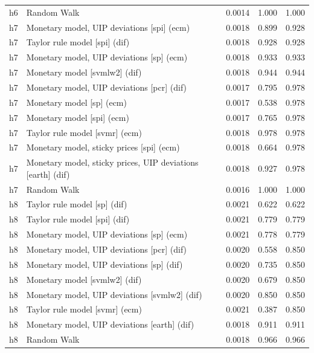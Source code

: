 \begin{ThreePartTable}
\begin{longtable}[t]{cp{5.5cm}ccc}
h6 & \raggedright Random Walk & 0.0014 & 1.000 & 1.000\\
\addlinespace
h7 & \raggedright Monetary model, UIP deviations [spi] (ecm) & 0.0018 & 0.899 & 0.928\\
h7 & \raggedright Taylor rule model [spi] (dif) & 0.0018 & 0.928 & 0.928\\
h7 & \raggedright Monetary model, UIP deviations [sp] (ecm) & 0.0018 & 0.933 & 0.933\\
h7 & \raggedright Monetary model [svmlw2] (dif) & 0.0018 & 0.944 & 0.944\\
h7 & \raggedright Monetary model, UIP deviations [pcr] (dif) & 0.0017 & 0.795 & 0.978\\
h7 & \raggedright Monetary model [sp] (ecm) & 0.0017 & 0.538 & 0.978\\
h7 & \raggedright Monetary model [spi] (ecm) & 0.0017 & 0.765 & 0.978\\
h7 & \raggedright Taylor rule model [svmr] (ecm) & 0.0018 & 0.978 & 0.978\\
h7 & \raggedright Monetary model, sticky prices [spi] (ecm) & 0.0018 & 0.664 & 0.978\\
h7 & \raggedright Monetary model, sticky prices, UIP deviations [earth] (dif) & 0.0018 & 0.927 & 0.978\\
h7 & \raggedright Random Walk & 0.0016 & 1.000 & 1.000\\
\addlinespace
h8 & \raggedright Taylor rule model [sp] (dif) & 0.0021 & 0.622 & 0.622\\
h8 & \raggedright Taylor rule model [spi] (dif) & 0.0021 & 0.779 & 0.779\\
h8 & \raggedright Monetary model, UIP deviations [sp] (ecm) & 0.0021 & 0.778 & 0.779\\
h8 & \raggedright Monetary model, UIP deviations [pcr] (dif) & 0.0020 & 0.558 & 0.850\\
h8 & \raggedright Monetary model, UIP deviations [sp] (dif) & 0.0020 & 0.735 & 0.850\\
h8 & \raggedright Monetary model [svmlw2] (dif) & 0.0020 & 0.679 & 0.850\\
h8 & \raggedright Monetary model, UIP deviations [svmlw2] (dif) & 0.0020 & 0.850 & 0.850\\
h8 & \raggedright Taylor rule model [svmr] (ecm) & 0.0021 & 0.387 & 0.850\\
h8 & \raggedright Monetary model, UIP deviations [earth] (dif) & 0.0018 & 0.911 & 0.911\\
h8 & \raggedright Random Walk & 0.0018 & 0.966 & 0.966\\

\end{longtable}
\end{ThreePartTable}
